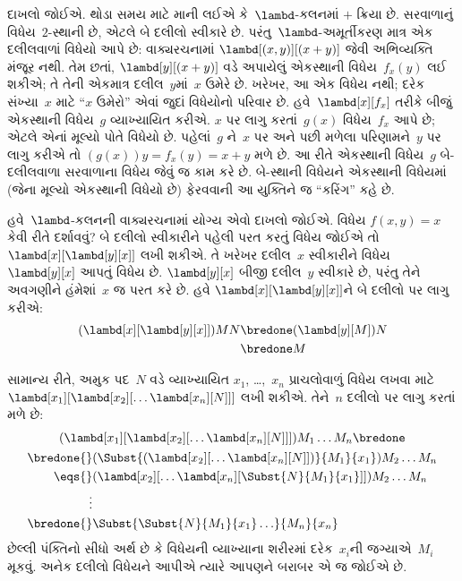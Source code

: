દાખલો જોઈએ. થોડા સમય માટે માની લઈએ કે~$\lambd$-કલનમાં
$+$ ક્રિયા છે. સરવાળાનું વિધેય~$2$-સ્થાની છે, એટલે બે દલીલો
સ્વીકારે છે. પરંતુ~$\lambd$-અમૂર્તીકરણ માત્ર એક દલીલવાળાં વિધેયો
આપે છે: વાક્યરચનામાં $\lambd[(x,y)][(x+y)]$ જેવી અભિવ્યક્તિ
મંજૂર નથી. તેમ છતાં, $\lambd[y][(x+y)]$ વડે અપાયેલું એકસ્થાની
વિધેય~$f_x(y)$ લઈ શકીએ; તે તેની એકમાત્ર દલીલ~$y$માં~$x$ ઉમેરે
છે. ખરેખર, આ એક વિધેય નથી; દરેક સંખ્યા~$x$ માટે ``$x$ ઉમેરો''
એવાં જુદાં વિધેયોનો પરિવાર છે. હવે~$\lambd[x][f_x]$ તરીકે બીજું
એકસ્થાની વિધેય~$g$ વ્યાખ્યાયિત કરીએ. $x$ પર લાગુ કરતાં~$g(x)$
વિધેય~$f_x$ આપે છે; એટલે એનાં મૂલ્યો પોતે વિધેયો છે. પહેલાં~$g$
ને~$x$ પર અને પછી મળેલા પરિણામને~$y$ પર લાગુ કરીએ તો
$(g(x))y = f_x(y) = x+y$ મળે છે. આ રીતે એકસ્થાની વિધેય~$g$
બે-દલીલવાળા સરવાળાના વિધેય જેવું જ કામ કરે છે. બે-સ્થાની વિધેયને
એકસ્થાની વિધેયમાં (જેના મૂલ્યો એકસ્થાની વિધેયો છે) ફેરવવાની
આ યુક્તિને જ ``કરિંગ'' કહે છે.

હવે~$\lambd$-કલનની વાક્યરચનામાં યોગ્ય એવો દાખલો જોઈએ.
વિધેય $f(x,y) = x$ કેવી રીતે દર્શાવવું? બે દલીલો સ્વીકારીને
પહેલી પરત કરતું વિધેય જોઈએ તો $\lambd[x][\lambd[y][x]]$ લખી
શકીએ. તે ખરેખર દલીલ~$x$ સ્વીકારીને વિધેય~$\lambd[y][x]$
આપતું વિધેય છે. $\lambd[y][x]$ બીજી દલીલ~$y$ સ્વીકારે છે,
પરંતુ તેને અવગણીને હંમેશાં~$x$ જ પરત કરે છે. હવે
$\lambd[x][\lambd[y][x]]$ને બે દલીલો પર લાગુ કરીએ:
\begin{align*}
  (\lambd[x][\lambd[y][x]])MN
  \bredone & (\lambd[y][M])N \\
  \bredone & M
\end{align*}

સામાન્ય રીતે, અમુક પદ~$N$ વડે વ્યાખ્યાયિત $x_1$, \dots,~$x_n$
પ્રાચલોવાળું વિધેય લખવા માટે
$\lambd[x_1][\lambd[x_2][\ldots\lambd[x_n][N]]]$ લખી શકીએ.
તેને~$n$ દલીલો પર લાગુ કરતાં મળે છે:
\begin{multline*}
  (\lambd[x_1][\lambd[x_2][\ldots\lambd[x_n][N]]]) M_1 \dots M_n \bredone\\
  \begin{aligned}
  \bredone {} & (\Subst{(\lambd[x_2][\ldots\lambd[x_n][N]])}{M_1}{x_1}) M_2
  \dots M_n\\
   \eqs {} & (\lambd[x_2][\ldots\lambd[x_n][\Subst{N}{M_1}{x_1}]]) M_2
            \dots M_n \\
  \vdots & \\
  \bredone {} &\Subst{\Subst{N}{M_1}{x_1}\ldots}{M_n}{x_n}
  \end{aligned}
\end{multline*}
છેલ્લી પંક્તિનો સીધો અર્થ છે કે વિધેયની વ્યાખ્યાના શરીરમાં
દરેક~$x_i$ની જગ્યાએ~$M_i$ મૂકવું. અનેક દલીલો વિધેયને આપીએ ત્યારે
આપણને બરાબર એ જ જોઈએ છે.
\endgroup


